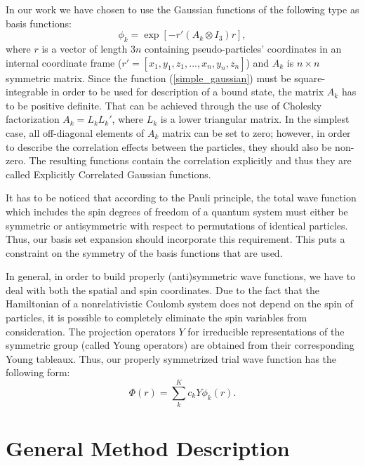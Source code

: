 In our work we have chosen to use the Gaussian functions 
of the following type as basis functions:
\begin{equation}
\phi_k = \exp \left[ - r' (A_k \otimes I_3) r \right],
\label{simple_gaussian}
\end{equation}
where $r$ is a vector of length $3n$ containing pseudo-particles'
coordinates in an internal coordinate frame ($r'=[x_1,y_1,z_1,...,x_n,y_n,z_n]$)
and $A_k$ is $n\times n$ symmetric matrix. Since the function (\ref{simple_gaussian})
must be square-integrable in order to be used for description of a bound state,
the matrix $A_k$ has to be positive definite. That can be achieved through the use
of Cholesky factorization $A_k=L_k L_k'$, where $L_k$ is a lower triangular matrix.
In the simplest case, all off-diagonal elements of $A_k$ matrix can be set to zero;
however, in order to describe the correlation effects between the particles,
they should also be non-zero. The resulting functions contain the correlation
explicitly and thus they are called Explicitly Correlated Gaussian functions.

It has to be noticed that according to the Pauli principle, the total wave function
which includes the spin degrees of freedom of a quantum system must either be symmetric 
or antisymmetric with respect to permutations of identical particles. 
Thus, our basis set expansion should incorporate this requirement. 
This puts a constraint on the symmetry of the basis 
functions that are used. 

In general, in order to build properly (anti)symmetric wave functions, we have to deal 
with both the spatial and spin coordinates. Due to the fact that the Hamiltonian of a
nonrelativistic Coulomb system does not depend on the spin of particles, it is possible 
to completely eliminate the spin variables from consideration. The projection operators
$Y$ for irreducible representations of the symmetric group (called Young operators) are 
obtained from their corresponding Young tableaux. Thus, our properly symmetrized 
trial wave function has the following form:
\begin{equation}
\Phi (r) = \sum_k^{K} c_k Y \phi_k(r).
\label{wf_perm}
\end{equation}



\section{General Method Description}

